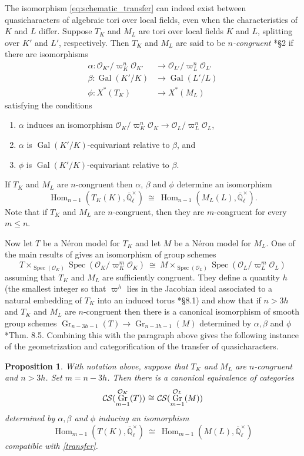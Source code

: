 \documentclass[10pt]{amsart}
\theoremstyle{plain}
\newtheorem{proposition}[theorem]{Proposition}
\theoremstyle{definition}
\newcommand{\EE}{\mathbb{\bar Q}_\ell}
\newcommand{\OK}{\mathcal{O}_K}
\newcommand{\OL}{\mathcal{O}_L}
\newcommand{\OO}[1]{\mathcal{O}_{#1}}
\newcommand{\EEx}{\EE^\times}
\DeclareMathOperator{\Gal}{Gal}
\DeclareMathOperator{\Hom}{Hom}
\DeclareMathOperator{\Gr}{Gr}
\newcommand{\Spec}[1]{{\operatorname{Spec}(#1)}}
\newcommand{\iso}{{\ \cong\ }}
\newcommand{\CS}{{\mathcal{C\hskip-0.8pt S}}}
\begin{document}
The isomorphism \eqref{eq:schematic_transfer} can indeed exist between quasicharacters of
algebraic tori over local fields, even when the characteristics of $K$ and $L$ differ.
Suppose $T_K$ and $M_L$ are tori over local fields $K$ and $L$,
splitting over $K'$ and $L'$, respectively.
Then $T_K$ and $M_L$ are said to be \emph{$n$-congruent} \cite{chai-yu:01a}*{\S 2} if there are isomorphisms
 \begin{align*}
  \alpha : \OO{K'}/\varpi_K^n \OO{K'} &\to \OO{L'}/\varpi_{L}^n \OO{L'} \\
  \beta : \Gal(K'/K) &\to \Gal(L'/L) \\
  \phi : X^*(T_K) &\to X^*(M_L)
 \end{align*}
 satisfying the conditions
 \begin{enumerate}
  \item $\alpha$ induces an isomorphism $\OK/\varpi_K^n \OK \to \OO{L}/\varpi_{L}^n \OO{L}$,
  \item $\alpha$ is $\Gal(K'/K)$-equivariant relative to $\beta$, and
  \item $\phi$ is $\Gal(K'/K)$-equivariant relative to $\beta$.
 \end{enumerate}
If $T_K$ and $M_L$ are $n$-congruent then $\alpha$, $\beta$ and $\phi$ determine an isomorphism 
\begin{equation}\label{transfer}
  \Hom_{n-1}(T_K(K), \EEx) \iso \Hom_{n-1}(M_L(L),\EEx).
\end{equation}
Note that if $T_K$ and $M_L$ are $n$-congruent, then they are $m$-congruent for every
$m \leq n$.

Now let $T$ be a N\'eron model for $T_K$ and let $M$ be a N\'eron model for $M_L$.
One of the main results of \cite{chai-yu:01a} gives an isomorphism of group schemes 
\[
T \times_{\Spec{\OK}} \Spec{\OK/\varpi_K^m\OK} \iso M \times_{\Spec{\OL}} \Spec{\OL/\varpi_L^m\OL}
\] 
assuming that $T_K$ and $M_L$ are sufficiently congruent.
They define a quantity $h$ (the smallest integer so that $\varpi^h$ lies in the
Jacobian ideal associated to a natural embedding of $T_K$ into an induced torus \cite{chai-yu:01a}*{\S 8.1}) and show
that if $n > 3h$ and $T_K$ and $M_L$ are $n$-congruent then there is a canonical isomorphism of smooth group schemes
 $
\Gr_{n-3h-1}(T) \to \Gr_{n-3h-1}(M)
 $
 determined by $\alpha, \beta$ and $\phi$ \cite{chai-yu:01a}*{Thm. 8.5}.
Combining this with the paragraph above gives the following instance of the geometrization and categorification of the transfer of quasicharacters.

\begin{proposition}\label{prop:transfer}
 With notation above, suppose that $T_K$ and $M_L$ are $n$-congruent and $n > 3h$.  Set $m = n-3h$.
 Then there is a canonical equivalence of categories
 \[
 \CS(\Gr^{\OK}_{m-1}(T)) \iso \CS(\Gr^{\OL}_{m-1}(M))
 \]
 determined by $\alpha, \beta$ and $\phi$ inducing an isomorphism
 \[
\Hom_{m-1}(T(K), \EEx) \iso  \Hom_{m-1}(M(L), \EEx)
 \]
compatible with \eqref{transfer}.
\end{proposition}

   
\end{document}
